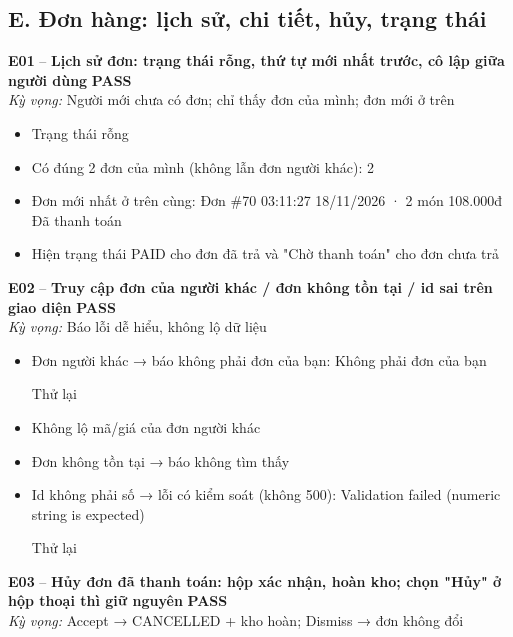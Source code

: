 \documentclass[a4paper,11pt]{article}
\newcommand{\ok}{\textcolor{okgreen}{\textbf{PASS}}}
\begin{document}
\subsection{E. Đơn hàng: lịch sử, chi tiết, hủy, trạng thái}
\begin{minipage}{\textwidth}\vspace{4pt}\textbf{\textcolor{brew}{E01}} -- \textbf{Lịch sử đơn: trạng thái rỗng, thứ tự mới nhất trước, cô lập giữa người dùng} \hfill \ok\\
{\small\emph{Kỳ vọng:} Người mới chưa có đơn; chỉ thấy đơn của mình; đơn mới ở trên}
\end{minipage}
\begin{itemize}\footnotesize
\item \tick Trạng thái rỗng
\item \tick Có đúng 2 đơn của mình (không lẫn đơn người khác): 2
\item \tick Đơn mới nhất ở trên cùng: Đơn \#70  03:11:27 18/11/2026 · 2 món  108.000đ  Đã thanh toán
\item \tick Hiện trạng thái PAID cho đơn đã trả và "Chờ thanh toán" cho đơn chưa trả
\end{itemize}
\begin{minipage}{\textwidth}\vspace{4pt}\textbf{\textcolor{brew}{E02}} -- \textbf{Truy cập đơn của người khác / đơn không tồn tại / id sai trên giao diện} \hfill \ok\\
{\small\emph{Kỳ vọng:} Báo lỗi dễ hiểu, không lộ dữ liệu}
\end{minipage}
\begin{itemize}\footnotesize
\item \tick Đơn người khác → báo không phải đơn của bạn: Không phải đơn của bạn

Thử lại
\item \tick Không lộ mã/giá của đơn người khác
\item \tick Đơn không tồn tại → báo không tìm thấy
\item \tick Id không phải số → lỗi có kiểm soát (không 500): Validation failed (numeric string is expected)

Thử lại
\end{itemize}
\begin{minipage}{\textwidth}\vspace{4pt}\textbf{\textcolor{brew}{E03}} -- \textbf{Hủy đơn đã thanh toán: hộp xác nhận, hoàn kho; chọn "Hủy" ở hộp thoại thì giữ nguyên} \hfill \ok\\
{\small\emph{Kỳ vọng:} Accept → CANCELLED + kho hoàn; Dismiss → đơn không đổi}
\end{minipage}
\end{document}
